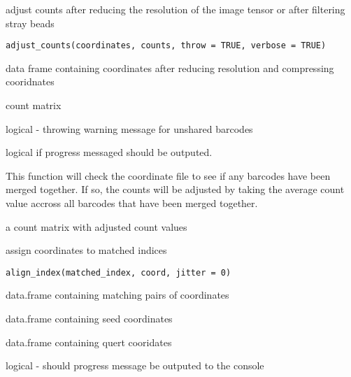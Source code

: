 \documentclass[a4paper]{book}
\begin{document}
%
\begin{Description}
adjust counts after reducing the resolution of the image tensor
or after filtering stray beads
\end{Description}
%
\begin{Usage}
\begin{verbatim}
adjust_counts(coordinates, counts, throw = TRUE, verbose = TRUE)
\end{verbatim}
\end{Usage}
%
\begin{Arguments}
\begin{ldescription}
\item[\code{coordinates}] data frame containing coordinates after reducing 
resolution and compressing cooridnates

\item[\code{counts}] count matrix

\item[\code{throw}] logical - throwing warning message for unshared barcodes

\item[\code{verbose}] logical if progress messaged should be outputed.
\end{ldescription}
\end{Arguments}
%
\begin{Details}
This function will check the coordinate file to 
see if any barcodes have been merged together. If so,
the counts will be adjusted by taking the average count value accross 
all barcodes that have been merged together.
\end{Details}
%
\begin{Value}
a count matrix with adjusted count values
\end{Value}
%
\begin{Description}
assign coordinates to matched indices
\end{Description}
%
\begin{Usage}
\begin{verbatim}
align_index(matched_index, coord, jitter = 0)
\end{verbatim}
\end{Usage}
%
\begin{Arguments}
\begin{ldescription}
\item[\code{matched\_index}] data.frame containing matching pairs of 
coordinates

\item[\code{seed}] data.frame containing seed coordinates

\item[\code{query}] data.frame containing quert cooridates

\item[\code{verbose}] logical - should progress message be outputed to the 
console
\end{ldescription}
\end{Arguments}
\end{document}
